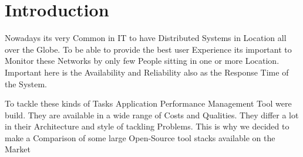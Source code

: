 
\chapter{Introduction}
Nowadays its very Common in IT to have Distributed Systems in Location all over the Globe. To be able to provide the best user Experience its important to Monitor these Networks by only few People sitting in one or more Location. Important here is the Availability and Reliability also as the Response Time of the System. 

To tackle these kinds of Tasks Application Performance Management Tool were build. They are available in a wide range of Costs and Qualities. They differ a lot in their Architecture and style of tackling Problems. This is why we decided to make a Comparison of some large Open-Source tool stacks available on the Market 


